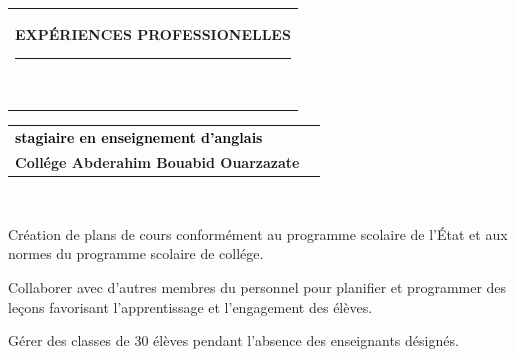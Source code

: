 \documentclass[10pt,A4]{article}
\newcommand{\mpwidth}{\linewidth-\fboxsep-\fboxsep}
\newcommand{\cvlist}[1] {
	\begin{itemize}{#1}\end{itemize}
}
\newcommand{\cvtext}[1] {
	\begin{tabular*}{1\mpwidth}{p{0.98\mpwidth}}
		\parbox{1\mpwidth}{#1}
	\end{tabular*}
}
\newcommand{\cvsection}[1] {
	\vspace{14pt}
	\cvtext{
		\textbf{\LARGE{\textcolor{darkcol}{\uppercase{#1}}}}\\[-4pt]
		\textcolor{maincol}{ \rule{0.1\textwidth}{2pt} } \\
	}
}
\newcommand{\cvevent}[7] {
	
	\parbox{\mpwidth}{
		\begin{tabular*}{\mpwidth}{p{0.72\mpwidth}  r}
	 		\textcolor{black}{\textbf{#2}} & \colorbox{maincol}{\makebox[0.25\mpwidth]{\textcolor{white}{#1}}} \\
			\textcolor{maincol}{\textbf{#3}} & \\
		\end{tabular*}\\

		\ifthenelse{\isempty{#4}}{}{
	\cvtext{#4}\\
}


	{#5}




	
	
	}



 
}
\begin{document}
\begin{paracol}{2}
\begin{rightcolumn}
	
 
 \vspace{7pt}

\cvsection{EXPÉRIENCES PROFESSIONELLES}

\cvevent
{2016
}
{stagiaire en enseignement d'anglais }
{Collége Abderahim Bouabid Ouarzazate}
{}
{}
{\cvlist{
		\item Creation of a web portal for role- and rights management
		\item Establishing a connection to the existing MicroFocus role solution
		\item Development of new role-based workfows and processes, as well as training and support
		\item Maintenance of existing infrastructure
}}
{\cvlist {
		\item
		Création de plans de cours conformément au programme scolaire de l'État et aux normes du programme scolaire de collége.
			\item	
		Collaborer avec d'autres membres du personnel pour planifier et programmer des leçons favorisant l'apprentissage et l'engagement des élèves.
				\item
		Gérer des classes de 30 élèves pendant l'absence des enseignants désignés. 
}}
{\cvlist {
		\item
		Création de plans de cours conformément au programme scolaire de l'État et aux normes du programme scolaire de collége.
		\item	
		Collaborer avec d'autres membres du personnel pour planifier et programmer des leçons favorisant l'apprentissage et l'engagement des élèves.
		\item
		Gérer des classes de 30 élèves pendant l'absence des enseignants désignés. 
}}

\vspace{7pt}


\end{rightcolumn}
\end{paracol}
\end{document}
